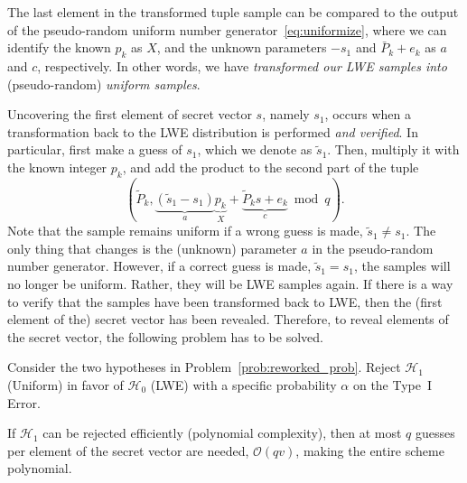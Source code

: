 \documentclass[journal, twoside, web]{ieeecolorpreprint}
\newtheorem{rem}{Remark}
\begin{document}
The last element in the transformed tuple sample can be compared to the output of the pseudo-random uniform number generator~\eqref{eq:uniformize}, where we can identify the known $p_k$ as $X$, and the unknown parameters $-s_1$ and $\bar P_k + e_k$ as $a$ and $c$, respectively. In other words, we have \emph{transformed our LWE samples into} (pseudo-random) \emph{uniform samples}.


Uncovering the first element of secret vector $s$, namely $s_1$, occurs when a transformation back to the LWE distribution is performed \emph{and verified}. In particular, first make a guess of $s_1$, which we denote as $\tilde s_1$. Then, multiply it with the known integer $p_k$, and add the product to the second part of the tuple
\begin{equation*}
    (\tilde P_k, \underbrace{(\tilde s_1 - s_1)}_a \underbrace{p_k}_X + \underbrace{\tilde P_ks +e_k}_{c}  \bmod q).
\end{equation*}
Note that the sample remains uniform if a wrong guess is made, $\tilde s_1 \neq s_1$. The only thing that changes is the (unknown) parameter $a$ in the pseudo-random number generator. However, if a correct guess is made, $\tilde s_1=s_1$, the samples will no longer be uniform. Rather, they will be LWE samples again. If there is a way to verify that the samples have been transformed back to LWE, then the (first element of the) secret vector has been revealed. Therefore, to reveal elements of the secret vector, the following problem has to be solved.
\begin{regevProblem}
    Consider the two hypotheses in Problem~\ref{prob:reworked_prob}. Reject $\mathcal{H}_1$ (Uniform) in favor of $\mathcal{H}_0$ (LWE) with a specific probability $\alpha$ on the Type~I Error.
\end{regevProblem}

If $\mathcal{H}_1$ can be rejected efficiently (polynomial complexity), then at most $q$ guesses per element of the secret vector are needed, $\mathcal{O}(qv)$, making the entire scheme polynomial.

\end{document}
